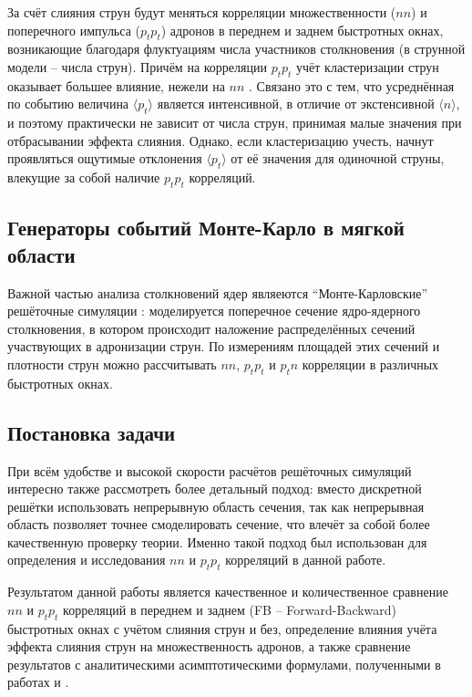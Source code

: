 За счёт слияния струн будут меняться корреляции множественности ($nn$) и поперечного импульса ($p_t p_t$) адронов в переднем и заднем быстротных окнах, возникающие благодаря флуктуациям числа участников столкновения (в струнной модели -- числа струн). 
Причём на корреляции $p_t p_t$ учёт кластеризации струн оказывает большее влияние, нежели на $nn$ \cite{MulReduction, PtPtCorr}. 
Связано это с тем, что усреднённая по событию величина $\langle p_t \rangle$ является интенсивной, в отличие от экстенсивной $\langle n \rangle$, и поэтому практически не зависит от числа струн, принимая малые значения при отбрасывании эффекта слияния. 
Однако, если кластеризацию учесть, начнут проявляться ощутимые отклонения $\langle p_t \rangle$ от её значения для одиночной струны, влекущие за собой наличие $p_t p_t$ корреляций.
\subsection{Генераторы событий Монте-Карло в мягкой области}
Важной частью анализа столкновений ядер являеются ``Монте-Карловские'' решёточные симуляции \cite{TransLattice1}: моделируется поперечное сечение ядро-ядерного столкновения, в котором происходит наложение распределённых сечений участвующих в адронизации струн. 
По измерениям площадей этих сечений и плотности струн можно рассчитывать $nn$, $p_t p_t$ и $p_t n$ корреляции в различных быстротных окнах.
\subsection{Постановка задачи}
При всём удобстве  и высокой скорости расчётов решёточных симуляций интересно также рассмотреть более детальный подход: вместо дискретной решётки использовать непрерывную область сечения, так как непрерывная область позволяет точнее смоделировать сечение, что влечёт за собой более качественную проверку теории. 
Именно такой подход был использован для определения и исследования $nn$ и $p_tp_t$ корреляций в данной работе. 

Результатом данной работы является качественное и количественное сравнение $nn$ и $p_tp_t$ корреляций в переднем и заднем (FB -- Forward-Backward) быстротных окнах с учётом слияния струн и без, определение влияния учёта эффекта слияния струн на множественность адронов, а также сравнение результатов с аналитическими асимптотическими формулами, полученными в работах \cite{bStatement} и \cite{dissert}.

